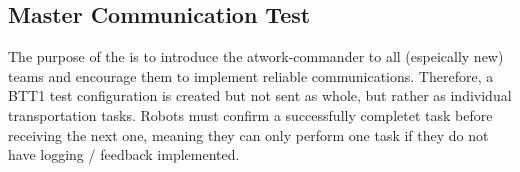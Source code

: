 
\newpage
\subsection{Master Communication Test}

The purpose of the  is to introduce the atwork-commander to all (espeically new) teams and encourage them to implement reliable communications.
Therefore, a BTT1 test configuration is created but not sent as whole, but rather as individual transportation tasks.
Robots must confirm a successfully completet task before receiving the next one, meaning they can only perform one task if they do not have logging / feedback implemented.
